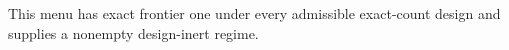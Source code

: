 This menu has exact frontier one under every admissible exact-count design and supplies a nonempty design-inert regime.